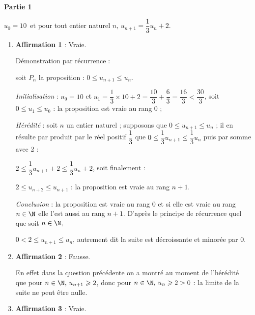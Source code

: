 \medskip









\textbf{Partie 1}

\medskip



\begin{center}$u_0 = 10$\, et pour tout entier naturel $n,\,u_{n+1} = \dfrac13 u_n + 2$.\end{center}

\medskip

\begin{enumerate}
\item \textbf{Affirmation 1} : Vraie. 

Démonstration par récurrence :

soit $P_n$ la proposition : \og $0 \leqslant u_{n+1} \leqslant u_n $\fg.

\emph{Initialisation} : $u_0 = 10$ et $u_1 = \dfrac13 \times 10 + 2 = \dfrac{10}{3} + \dfrac63 = \dfrac{16}{3} < \dfrac{30}{3}$, soit $0\leqslant u_1 \leqslant u_0$ : la proposition est vraie au rang $0$ ;

\emph{Hérédité} : soit $n$ un entier naturel ; supposons que  $0\leqslant u_{n+1} \leqslant u_n$ ; il en résulte par produit par le réel positif $\dfrac13$ que \quad  $0 \leqslant \dfrac13 u_{n+1} \leqslant \dfrac13 u_n$ puis par somme avec 2 :

$2 \leqslant \dfrac13 u_{n+1} + 2 \leqslant \dfrac13 u_n + 2$, soit finalement :

$2 \leqslant u_{n+2} \leqslant u_{n+1}$ : la proposition est vraie au rang $n + 1$.

\emph{Conclusion} : la proposition est vraie au rang 0 et si elle est vraie au rang $n \in \N$ elle l'est aussi au rang $n + 1$. D'après le principe de récurrence quel que soit $n \in \N,\,$

$ 0 < 2 \leqslant u_{n+1} \leqslant u_n$, autrement dit la suite est décroissante et minorée par $0$.

\item \textbf{Affirmation 2} : Fausse.

En effet dans la question précédente on a montré au moment de l'hérédité que pour $n \in \N, \, u_{n+1} \geqslant 2$, donc pour $n\in \N, \, u_n \geqslant 2 > 0$ : la limite de la suite ne peut être nulle.
\item \textbf{Affirmation 3} : Vraie.


\end{enumerate}

